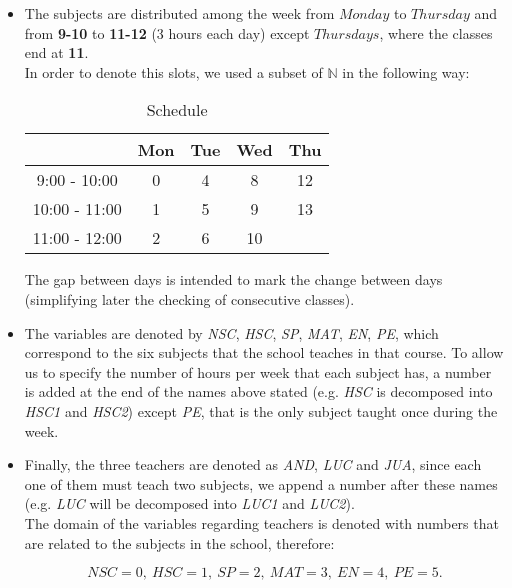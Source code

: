 \begin{itemize}
    \item The subjects are distributed among the week from $Monday$ to $Thursday$ and from \textbf{9-10} to \textbf{11-12} (3 hours each day) except $Thursdays$, where the classes end at \textbf{11}.\\
    In order to denote this slots, we used a subset of $\mathbb{N}$ in the following way:\\
    
    \begin{table}[h]
        \centering
        \begin{tabular}{|c|c|c|c|c|}
            \hline
            & \textbf{Mon} & \textbf{Tue} & \textbf{Wed} & \textbf{Thu} \\ \hline
            9:00 - 10:00  & 0            & 4            & 8            & 12           \\ \hline
            10:00 - 11:00 & 1            & 5            & 9            & 13           \\ \hline
            11:00 - 12:00 & 2            & 6            & 10           &              \\ \hline
        \end{tabular}
        \caption{Schedule}
        \label{tb: part 1: schedule}
    \end{table}
    
    The gap between days is intended to mark the change between days (simplifying later the checking of consecutive classes).
    
    \item The variables are denoted by \textit{NSC}, \textit{HSC}, \textit{SP}, \textit{MAT}, \textit{EN}, \textit{PE}, which correspond to the six subjects that the school teaches in that course. To allow us to specify the number of hours per week that each subject has, a number is added at the end of the names above stated (e.g. \textit{HSC} is decomposed into \textit{HSC1} and \textit{HSC2}) except \textit{PE}, that is the only subject taught once during the week.
    
    \item Finally, the three teachers are denoted as \textit{AND}, \textit{LUC} and \textit{JUA}, since each one of them must teach two subjects, we append a number after these names (e.g. \textit{LUC} will be decomposed into \textit{LUC1} and \textit{LUC2}).\\
    
    The domain of the variables regarding teachers is denoted with numbers that are related to the subjects in the school, therefore:
    
\begin{equation}
    NSC = 0,\ HSC = 1,\ SP = 2,\ MAT = 3,\ EN = 4,\ PE = 5.
\end{equation}
    
    
    
    
    
\end{itemize}

